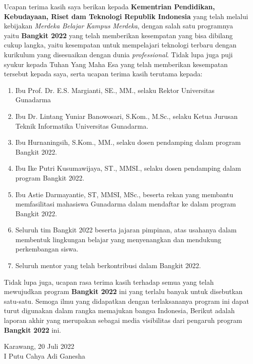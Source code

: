 {
Ucapan terima kasih saya berikan kepada \textbf{Kementrian Pendidikan, Kebudayaan, Riset dam Teknologi Republik Indonesia} yang telah melalui kebijakan \textit{Merdeka Belajar Kampus Merdeka}, dengan salah satu programnya yaitu \textbf{Bangkit 2022} yang telah memberikan kesempatan yang bisa dibilang cukup langka, yaitu kesempatan untuk mempelajari teknologi terbaru dengan kurikulum yang disesuaikan dengan dunia \textit{professional}. Tidak lupa juga puji syukur kepada Tuhan Yang Maha Esa yang telah memberikan kesempatan tersebut kepada saya, serta ucapan terima kasih terutama kepada:
\begin{enumerate}
    \item Ibu Prof. Dr. E.S. Margianti, SE., MM., selaku Rektor Universitas Gunadarma
    \item Ibu Dr. Lintang Yuniar Banowosari, S.Kom., M.Sc., selaku Ketua Jurusan Teknik
Informatika Universitas Gunadarma.
    \item Ibu Hurnaningsih, S.Kom., MM., selaku dosen pendamping dalam program Bangkit 2022.
    \item Ibu Ike Putri Kusumawijaya, ST., MMSI., selaku dosen pendamping dalam program Bangkit 2022.
    \item Ibu Astie Darmayantie, ST, MMSI, MSc., beserta rekan yang membantu memfasilitasi mahasiswa Gunadarma dalam mendaftar ke dalam program Bangkit 2022.
    \item Seluruh tim Bangkit 2022 beserta jajaran pimpinan, atas usahanya dalam membentuk lingkungan belajar yang menyenangkan dan mendukung perkembangan siswa.
    \item Seluruh mentor yang telah berkontribusi dalam Bangkit 2022.
\end{enumerate}
Tidak lupa juga, ucapan rasa terima kasih terhadap semua yang telah mewujudkan program \textbf{Bangkit 2022} ini yang terlalu banyak untuk disebutkan satu-satu. Semoga ilmu yang didapatkan dengan terlaksananya program ini dapat turut digunakan dalam rangka memajukan bangsa Indonesia, Berikut adalah laporan akhir yang merupakan sebagai media visibilitas dari pengaruh program \textbf{Bangkit 2022} ini.

\vspace{2.3cm}

\begin{flushright}
Karawang, 20 Juli 2022 \\
\vspace{2cm}
I Putu Cahya Adi Ganesha
\end{flushright}
}

